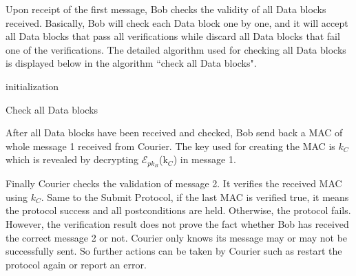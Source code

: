 Upon receipt of the first message, Bob checks the validity of all Data blocks received. Basically, Bob will check each Data block one by one, and it will accept all Data blocks that pass all verifications while discard all Data blocks that fail one of the verifications. The detailed algorithm used for checking all Data blocks is displayed below in the algorithm ``check all Data blocks".

\begin{algorithm}[H]
 initialization\;
\caption{Check all Data blocks}
\end{algorithm}
\bigskip
\bigskip

After all Data blocks have been received and checked, Bob send back a MAC of whole message 1 received from Courier. The key used for creating the MAC is $ k_C $ which is revealed by decrypting $\mathcal{E}_{pk_B}$(k$_C$) in message 1. 

Finally Courier checks the validation of message 2. It verifies the received MAC using $ k_C $. Same to the Submit Protocol, if the last MAC is verified true, it means the protocol success and all postconditions are held. Otherwise, the protocol fails. However, the verification result does not prove the fact whether Bob has received the correct message 2 or not. Courier only knows its message may or may not be successfully sent. So further actions can be taken by Courier such as restart the protocol again or report an error.
